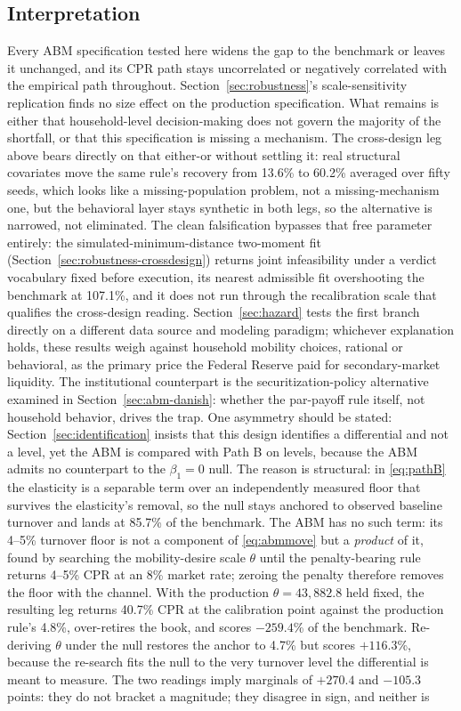 \documentclass[12pt]{article}
\begin{document}
\subsection{Interpretation}\label{sec:abm-interp}

Every ABM specification tested here widens the gap to the benchmark or leaves it unchanged, and its CPR path stays uncorrelated or negatively correlated with the empirical path throughout. Section~\ref{sec:robustness}'s scale-sensitivity replication finds no size effect on the production specification. What remains is either that household-level decision-making does not govern the majority of the shortfall, or that this specification is missing a mechanism. The cross-design leg above bears directly on that either-or without settling it: real structural covariates move the same rule's recovery from 13.6\% to 60.2\% averaged over fifty seeds, which looks like a missing-population problem, not a missing-mechanism one, but the behavioral layer stays synthetic in both legs, so the alternative is narrowed, not eliminated. The clean falsification bypasses that free parameter entirely: the simulated-minimum-distance two-moment fit (Section~\ref{sec:robustness-crossdesign}) returns joint infeasibility under a verdict vocabulary fixed before execution, its nearest admissible fit overshooting the benchmark at 107.1\%, and it does not run through the recalibration scale that qualifies the cross-design reading. Section~\ref{sec:hazard} tests the first branch directly on a different data source and modeling paradigm; whichever explanation holds, these results weigh against household mobility choices, rational or behavioral, as the primary price the Federal Reserve paid for secondary-market liquidity. The institutional counterpart is the securitization-policy alternative examined in Section~\ref{sec:abm-danish}: whether the par-payoff rule itself, not household behavior, drives the trap. One asymmetry should be stated: Section~\ref{sec:identification} insists that this design identifies a differential and not a level, yet the ABM is compared with Path B on levels, because the ABM admits no counterpart to the $\beta_1 = 0$ null. The reason is structural: in \eqref{eq:pathB} the elasticity is a separable term over an independently measured floor that survives the elasticity's removal, so the null stays anchored to observed baseline turnover and lands at 85.7\% of the benchmark. The ABM has no such term: its 4--5\% turnover floor is not a component of \eqref{eq:abmmove} but a \emph{product} of it, found by searching the mobility-desire scale $\theta$ until the penalty-bearing rule returns 4--5\% CPR at an 8\% market rate; zeroing the penalty therefore removes the floor with the channel. With the production $\theta = 43{,}882.8$ held fixed, the resulting leg returns 40.7\% CPR at the calibration point against the production rule's 4.8\%, over-retires the book, and scores $-259.4$\% of the benchmark. Re-deriving $\theta$ under the null restores the anchor to 4.7\% but scores $+116.3$\%, because the re-search fits the null to the very turnover level the differential is meant to measure. The two readings imply marginals of $+270.4$ and $-105.3$ points: they do not bracket a magnitude; they disagree in sign, and neither is 
\end{document}
